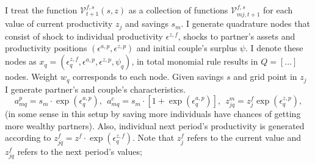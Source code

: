 \documentclass[12pt,letter]{article}
\begin{document}
I treat the function $\mathcal{V}^{f,s}_{t+1}(s,z)$ as a collection of functions $\mathcal{V}^{f,s}_{mj,t+1}$ for each value of current productivity $z_j$ and savings $s_m$. I generate quadrature nodes that consist of shock to individual productivity $\epsilon^{z,f}$, shocks to partner's assets and productivity positions
$(\epsilon^{a,p},\epsilon^{z,p})$ and initial couple's surplus $\psi$. I denote these nodes as $x_q = (\epsilon^{z,f}_q,\epsilon^{a,p},\epsilon^{z,p},\psi_q)$, in total monomial rule results in $Q = [...]$ nodes. Weight $w_q$ corresponds to each node. Given savings $s$ and grid point in $z_j$ I generate partner's and couple's characteristics. 
\[a^p_{mq} = s_m\cdot \exp(\epsilon^{a,p}_q), \ \ a^c_{mq} = s_m\cdot [1 + \exp(\epsilon^{a,p}_q)], \ \ z^m_{jq} = z^f_j \exp(\epsilon^{z,p}_q),\]
(in some sense in this setup by saving more individuals have chances of getting more wealthy partners).  Also, individual next period's productivity is generated according to $z^f_{jq} = z^f\cdot \exp(\epsilon^{z,f}_q)$. Note that $z^f_j$ refers to the current value and $z^f_{jq}$ refers to the next period's values;
\end{document}

